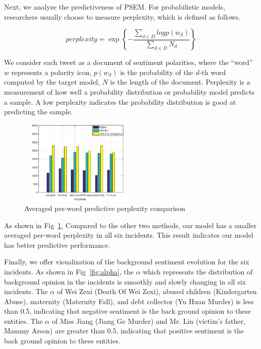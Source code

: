 \documentclass[runningheads]{llncs}
\begin{document}
Next, we analyze the predictiveness of PSEM. For probabilistic models, researchers usually choose to measure perplexity, which is defined as follows. 

\begin{equation}
    perplexity= \exp\left\{-\frac{\sum_{d \in D}logp(w_d)}{\sum_{d \in D}N_d} \right\}
\end{equation}

We consider each tweet as a document of sentiment polarities, where the ``word'' $w$ represents a polarity icon, $p(w_d)$ is the probability of the $d$-th word computed by the target model, $N$ is the length of the document. 
Perplexity is a measurement of how well a probability distribution or probability model predicts a sample. A low perplexity indicates the probability distribution is good at predicting the sample. 

\begin{figure}
    \centering
    \includegraphics[width=0.5\textwidth,height=1.6in]{perplexity.eps}
    \setlength{\abovecaptionskip}{-0.1cm}
    \caption{Averaged per-word predictive perplexity comparison}\label{fig:perplexity}
\end{figure}

As shown in Fig~\ref{fig:perplexity},  Compared to the other two methods, our model has a smaller averaged per-word perplexity in all six incidents. This result indicates our model has better predictive performance.


Finally, we offer visualization of the background sentiment evolution for the six incidents. 
As shown in Fig~\ref{fig:alpha}, the $\alpha$ which represents the distribution of background opinion in the incidents is smoothly and slowly changing in all six incidents. The $\alpha$ of Wei Zexi (Death Of Wei Zexi), abused children (Kindergarten Abuse), maternity (Maternity Fall), and debt collector (Yu Huan Murder) is less than 0.5, indicating that negative sentiment is the back ground opinion to these entities. The $\alpha$ of Miss Jiang (Jiang Ge Murder) and Mr. Lin (victim's father, Mammy Arson) are greater than 0.5, indicating that positive sentiment is the back ground opinion to these entities.%
\end{document}
